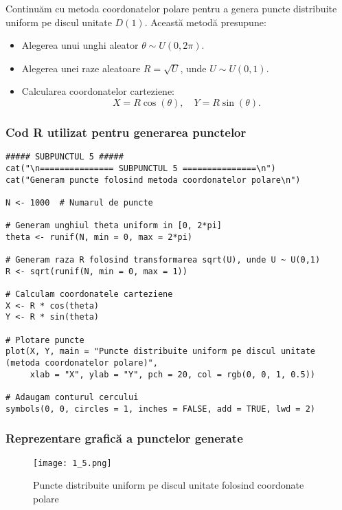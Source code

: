 \documentclass{article}
\begin{document}
Continuăm cu metoda coordonatelor polare pentru a genera puncte distribuite uniform pe discul unitate \( D(1) \).  
Această metodă presupune:
\begin{itemize}
    \item Alegerea unui unghi aleator \( \theta \sim U(0,2\pi) \).
    \item Alegerea unei raze aleatoare \( R = \sqrt{U} \), unde \( U \sim U(0,1) \).
    \item Calcularea coordonatelor carteziene:
          \[
          X = R \cos(\theta), \quad Y = R \sin(\theta).
          \]
\end{itemize}

\subsubsection*{Cod R utilizat pentru generarea punctelor}
\begin{lstlisting}
##### SUBPUNCTUL 5 #####
cat("\n=============== SUBPUNCTUL 5 ===============\n")
cat("Generam puncte folosind metoda coordonatelor polare\n")

N <- 1000  # Numarul de puncte

# Generam unghiul theta uniform in [0, 2*pi]
theta <- runif(N, min = 0, max = 2*pi)

# Generam raza R folosind transformarea sqrt(U), unde U ~ U(0,1)
R <- sqrt(runif(N, min = 0, max = 1))

# Calculam coordonatele carteziene
X <- R * cos(theta)
Y <- R * sin(theta)

# Plotare puncte
plot(X, Y, main = "Puncte distribuite uniform pe discul unitate (metoda coordonatelor polare)",
     xlab = "X", ylab = "Y", pch = 20, col = rgb(0, 0, 1, 0.5))

# Adaugam conturul cercului
symbols(0, 0, circles = 1, inches = FALSE, add = TRUE, lwd = 2)
\end{lstlisting}

\newpage

\subsubsection*{Reprezentare grafică a punctelor generate}

\begin{figure}[h]
    \centering
    \texttt{[image: 1\_5.png]}
    \caption{Puncte distribuite uniform pe discul unitate folosind coordonate polare}
    \label{fig:disc_polar_1000}
\end{figure}
\end{document}

